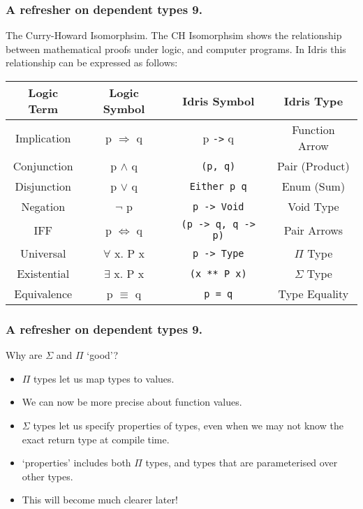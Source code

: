 \documentclass{beamer}
\begin{document}
\begin{frame}[fragile]
  \frametitle{A refresher on dependent types 9.}
  \begin{block}{The Curry-Howard Isomorphsim.}
  The CH Isomorphsim shows the relationship between mathematical
    proofs under logic, and computer programs. In Idris this
    relationship can be expressed as follows:
  \begin{table}[h!]
    \begin{tabular}{c|c|c|c}
    \textbf{Logic Term} & \textbf{Logic Symbol} & \textbf{Idris Symbol}
      & \textbf{Idris Type} \\
    \hline
      Implication & p $\Rightarrow$ q & p \texttt{->} q
      & Function Arrow \\
      Conjunction & p $\land$ q & \texttt{(p, q)} 
      & Pair (Product) \\
      Disjunction & p $\lor$ q & \texttt{Either p q}
      & Enum (Sum)\\
      Negation & $\lnot$ p & \texttt{p -> Void} &
      Void Type \\
      IFF & p $\iff$ q & \texttt{(p -> q, q -> p)}
      & Pair Arrows \\
      Universal & $\forall$ x. P x & 
      \texttt{p -> Type} & $\Pi$ Type \\
      Existential & $\exists$ x. P x
      & \texttt{(x ** P x)} & $\Sigma$ Type \\
      \hline
      Equivalence & p $\equiv$ q & \texttt{p = q} & Type Equality
    \end{tabular}
    
  \end{table}
  \end{block}
\end{frame}

\begin{frame}[fragile]
  \frametitle{A refresher on dependent types 9.}
  \begin{block}{Why are $\Sigma$ and $\Pi$ `good'?}
  \begin{itemize}
    \item $\Pi$ types let us map types to values.
    \item We can now be more precise about function values.
    \item $\Sigma$ types let us specify properties of types, even
      when we may not know the exact return type at compile time.
    \item `properties' includes both $\Pi$ types, and types that are
      parameterised over other types.
    \item This will become much clearer later!
  \end{itemize}
  \end{block}
\end{frame}
\end{document}
